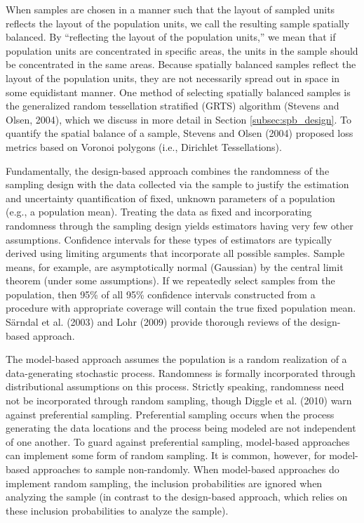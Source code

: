 \documentclass[]{elsarticle} %
\begin{document}
When samples are chosen in a manner such that the layout of sampled
units reflects the layout of the population units, we call the resulting
sample spatially balanced. By ``reflecting the layout of the population
units,'' we mean that if population units are concentrated in specific
areas, the units in the sample should be concentrated in the same areas.
Because spatially balanced samples reflect the layout of the population
units, they are not necessarily spread out in space in some equidistant
manner. One method of selecting spatially balanced samples is the
generalized random tessellation stratified (GRTS) algorithm (Stevens and
Olsen, 2004), which we discuss in more detail in Section
\ref{subsec:spb_design}. To quantify the spatial balance of a sample,
Stevens and Olsen (2004) proposed loss metrics based on Voronoi polygons
(i.e., Dirichlet Tessellations).

Fundamentally, the design-based approach combines the randomness of the
sampling design with the data collected via the sample to justify the
estimation and uncertainty quantification of fixed, unknown parameters
of a population (e.g., a population mean). Treating the data as fixed
and incorporating randomness through the sampling design yields
estimators having very few other assumptions. Confidence intervals for
these types of estimators are typically derived using limiting arguments
that incorporate all possible samples. Sample means, for example, are
asymptotically normal (Gaussian) by the central limit theorem (under
some assumptions). If we repeatedly select samples from the population,
then 95\% of all 95\% confidence intervals constructed from a procedure
with appropriate coverage will contain the true fixed population mean.
Särndal et al. (2003) and Lohr (2009) provide thorough reviews of the
design-based approach.

The model-based approach assumes the population is a random realization
of a data-generating stochastic process. Randomness is formally
incorporated through distributional assumptions on this process.
Strictly speaking, randomness need not be incorporated through random
sampling, though Diggle et al. (2010) warn against preferential
sampling. Preferential sampling occurs when the process generating the
data locations and the process being modeled are not independent of one
another. To guard against preferential sampling, model-based approaches
can implement some form of random sampling. It is common, however, for
model-based approaches to sample non-randomly. When model-based
approaches do implement random sampling, the inclusion probabilities are
ignored when analyzing the sample (in contrast to the design-based
approach, which relies on these inclusion probabilities to analyze the
sample).
\end{document}
